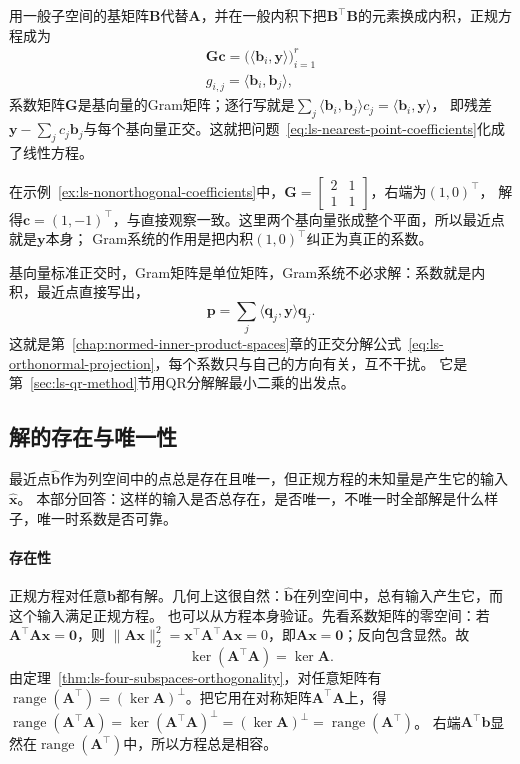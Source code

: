 用一般子空间的基矩阵$\bm B$代替$\bm A$，并在一般内积下把$\bm B^\top\bm B$的元素换成内积，正规方程成为
\begin{equation}
\begin{gathered}
\bm G\bm c=\bigl(\langle\bm b_i,\bm y\rangle\bigr)_{i=1}^r\\
g_{i,j}=\langle\bm b_i,\bm b_j\rangle,
\end{gathered}
\label{eq:ls-gram-system}
\end{equation}
系数矩阵$\bm G$是基向量的Gram矩阵；逐行写就是$\sum_j\langle\bm b_i,\bm b_j\rangle c_j=\langle\bm b_i,\bm y\rangle$，
即残差$\bm y-\sum_jc_j\bm b_j$与每个基向量正交。这就把问题~\eqref{eq:ls-nearest-point-coefficients}化成了线性方程。

在示例~\ref{ex:ls-nonorthogonal-coefficients}中，$\bm G=\left[\begin{smallmatrix}2&1\\1&1\end{smallmatrix}\right]$，右端为$(1,0)^\top$，
解得$\bm c=(1,-1)^\top$，与直接观察一致。这里两个基向量张成整个平面，所以最近点就是$\bm y$本身；
Gram系统的作用是把内积$(1,0)^\top$纠正为真正的系数。

基向量标准正交时，Gram矩阵是单位矩阵，Gram系统不必求解：系数就是内积，最近点直接写出，
\[
 \bm p=\sum_j\langle\bm q_j,\bm y\rangle\bm q_j .
\]
这就是第~\ref{chap:normed-inner-product-spaces}章的正交分解公式~\eqref{eq:ls-orthonormal-projection}，每个系数只与自己的方向有关，互不干扰。
它是第~\ref{sec:ls-qr-method}节用QR分解解最小二乘的出发点。

\subsection{解的存在与唯一性}
\label{sec:ls-ls-existence}

最近点$\hat{\bm b}$作为列空间中的点总是存在且唯一，但正规方程的未知量是产生它的输入$\hat{\bm x}$。
本部分回答：这样的输入是否总存在，是否唯一，不唯一时全部解是什么样子，唯一时系数是否可靠。

\paragraph{存在性}

正规方程对任意$\bm b$都有解。几何上这很自然：$\hat{\bm b}$在列空间中，总有输入产生它，而这个输入满足正规方程。
也可以从方程本身验证。先看系数矩阵的零空间：若$\bm A^\top\bm A\bm x=\bm0$，则
$\lVert\bm A\bm x\rVert_2^2=\bm x^\top\bm A^\top\bm A\bm x=0$，即$\bm A\bm x=\bm0$；反向包含显然。故
\begin{equation}
 \ker(\bm A^\top\bm A)=\ker\bm A.
 \label{eq:ls-normal-kernel}
\end{equation}
由定理~\ref{thm:ls-four-subspaces-orthogonality}，对任意矩阵有$\operatorname{range}(\bm A^\top)=(\ker\bm A)^\perp$。把它用在对称矩阵$\bm A^\top\bm A$上，得
$\operatorname{range}(\bm A^\top\bm A)=\ker(\bm A^\top\bm A)^\perp=(\ker\bm A)^\perp=\operatorname{range}(\bm A^\top)$。
右端$\bm A^\top\bm b$显然在$\operatorname{range}(\bm A^\top)$中，所以方程总是相容。

